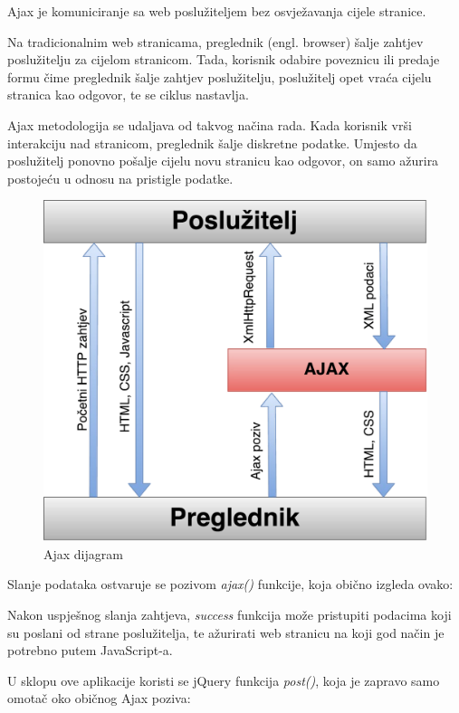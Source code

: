 \documentclass[times, utf8, zavrsni]{fer}
\begin{document}
Ajax je komuniciranje sa web poslužiteljem bez osvježavanja cijele stranice.\citep{ajax}

Na tradicionalnim web stranicama, preglednik (engl. browser) šalje zahtjev poslužitelju za cijelom stranicom. Tada, korisnik odabire poveznicu ili predaje formu čime preglednik šalje zahtjev poslužitelju, poslužitelj opet vraća cijelu stranica kao odgovor, te se ciklus nastavlja.

Ajax metodologija se udaljava od takvog načina rada. Kada korisnik vrši interakciju nad stranicom, preglednik šalje diskretne podatke. Umjesto da poslužitelj ponovno pošalje cijelu novu stranicu kao odgovor, on samo ažurira postojeću u odnosu na pristigle podatke.

\begin{figure}[H]
\centering
\includegraphics[scale=0.5]{img/ajax-dijagram.pdf}
\caption{Ajax dijagram}
\label{fig:ajax-dijagram}
\end{figure}

Slanje podataka ostvaruje se pozivom \emph{ajax()} funkcije, koja obično izgleda ovako:

\lstset{style=js}


Nakon uspješnog slanja zahtjeva, \emph{success} funkcija može pristupiti podacima koji su poslani od strane poslužitelja, te ažurirati web stranicu na koji god način je potrebno putem JavaScript-a.

U sklopu ove aplikacije koristi se jQuery funkcija \emph{post()}, koja je zapravo samo omotač oko običnog Ajax poziva:
\end{document}
